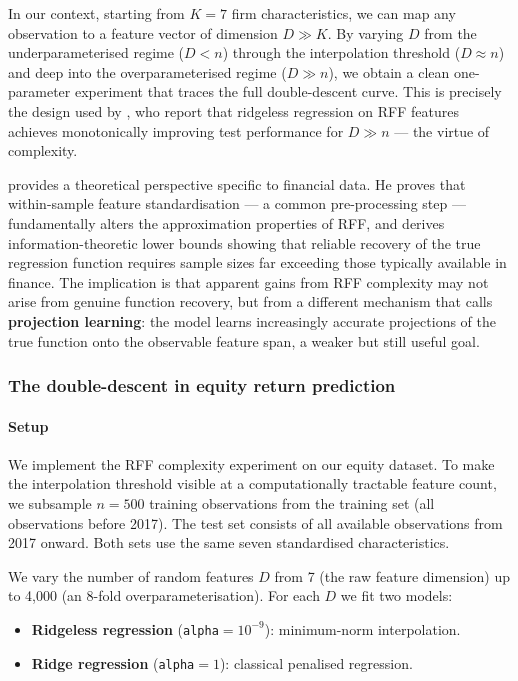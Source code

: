 In our context, starting from $K = 7$ firm characteristics, we can map any observation to a feature vector of dimension $D \gg K$. By varying $D$ from the underparameterised regime ($D < n$) through the interpolation threshold ($D \approx n$) and deep into the overparameterised regime ($D \gg n$), we obtain a clean one-parameter experiment that traces the full double-descent curve. This is precisely the design used by \cite{kelly2024virtue}, who report that ridgeless regression on RFF features achieves monotonically improving test performance for $D \gg n$ --- the virtue of complexity.

\cite{fallahgoul2025high} provides a theoretical perspective specific to financial data. He proves that within-sample feature standardisation --- a common pre-processing step --- fundamentally alters the approximation properties of RFF, and derives information-theoretic lower bounds showing that reliable recovery of the true regression function requires sample sizes far exceeding those typically available in finance. The implication is that apparent gains from RFF complexity may not arise from genuine function recovery, but from a different mechanism that \cite{fallahgoul2025learning} calls \textbf{projection learning}: the model learns increasingly accurate projections of the true function onto the observable feature span, a weaker but still useful goal.

\subsubsection{The double-descent in equity return prediction}\label{sec_comp_demo}

\paragraph{Setup}

We implement the RFF complexity experiment on our equity dataset. To make the interpolation threshold visible at a computationally tractable feature count, we subsample $n = 500$ training observations from the training set (all observations before 2017). The test set consists of all available observations from 2017 onward. Both sets use the same seven standardised characteristics.

We vary the number of random features $D$ from 7 (the raw feature dimension) up to 4,000 (an 8-fold overparameterisation). For each $D$ we fit two models:

\begin{itemize}
\item \textbf{Ridgeless regression} (\texttt{alpha}$= 10^{ -9}$): minimum-norm interpolation.
\item \textbf{Ridge regression} (\texttt{alpha}$= 1$): classical penalised regression.
\end{itemize}

